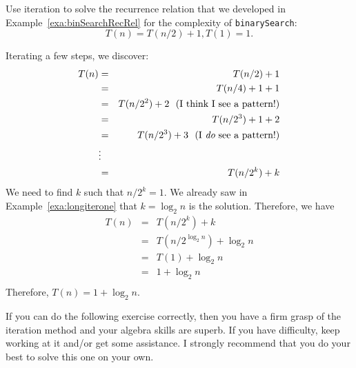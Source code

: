 \newpage
\begin{exer}
Use iteration to solve the recurrence relation that we developed in Example~\ref{exa:binSearchRecRel}
for the complexity of \verb+binarySearch+:
$$T(n)=T(n/2)+1, T(1)=1.$$
\vspace*{7.5in}
\begin{answer}
Iterating a few steps, we discover:
\begin{eqnarray*}
T(n)&=&T(n/2)+1\\
&=&T(n/4)+1+1\\
&=&T(n/2^2)+2\, \, \, \, \mbox{(I think I see a pattern!)}\\
&=&T(n/2^3)+1+2\\
&=&T(n/2^3)+3\, \, \, \, \mbox{(I {\em do} see a pattern!)}\\
&\vdots&\\
&=&T(n/2^k)+k\\
\end{eqnarray*}
We need to find $k$ such that $n/2^k=1$.
We already saw in Example~\ref{exa:longiterone} that $k=\log_2 n$ is the solution.
Therefore, we have
\begin{eqnarray*}
T(n)&=&T(n/2^k)+k\\
&=&T(n/2^{\log_2 n})+\log_2 n\\
&=&T(1)+\log_2 n\\
&=&1+\log_2 n\\
\end{eqnarray*}
Therefore, 
$T(n)=1+\log_2 n$.
\end{answer}
\end{exer}

\newpage

If you can do the following exercise correctly, then you have a firm grasp of the 
iteration method and your algebra skills are superb.  If you have difficulty, keep
working at it and/or get some assistance. I strongly recommend that you do your
best to solve this one on your own.

